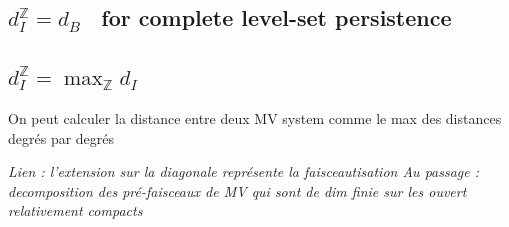 \documentclass[a4paper, english, 11pt]{article}
\newcommand{\0}{\vec{0}}
\newcommand{\Z}[0]{\mathbb{Z}}
\begin{document}
\subsection{\og $d_I^\Z = d_B$ \fg ~for complete level-set persistence}

\subsection{\og $d_I^\Z = \max_\Z d_I$\fg~}
On peut calculer la distance entre deux MV system comme le max des distances degrés par degrés


\emph{
Lien : l'extension sur la diagonale représente la faisceautisation
Au passage : decomposition des pré-faisceaux de MV qui sont de dim finie sur les ouvert relativement compacts
}







\end{document}
